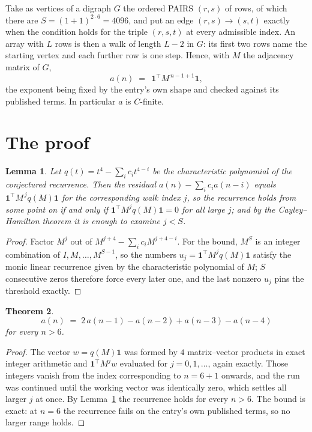 \documentclass[11pt,a4paper]{article}
\theoremstyle{plain}
\newtheorem{theorem}{Theorem}
\newtheorem{lemma}[theorem]{Lemma}
\theoremstyle{definition}
\begin{document}
Take as vertices of a digraph $G$ the ordered PAIRS $(r,s)$ of rows, of which there are
$S=(1+1)^{2\cdot6}=4096$, and put an edge $(r,s)\to(s,t)$ exactly when the condition
holds for the triple $(r,s,t)$ at every admissible index. An array with $L$ rows is then a
walk of length $L-2$ in $G$: its first two rows name the starting vertex and each further
row is one step. Hence, with $M$ the adjacency matrix of $G$,
\[
a(n)\;=\;\,\mathbf{1}^{\!\top}M^{\,n-1+1}\mathbf{1},
\]
the exponent being fixed by the entry's own shape and checked against its published terms.
In particular $a$ is $C$-finite.

\section{The proof}

\begin{lemma}\label{lem:crit}
Let $q(t)=t^{4}-\sum_i c_it^{4-i}$ be the characteristic polynomial of the
conjectured recurrence. Then the residual $a(n)-\sum_ic_ia(n-i)$ equals
$\mathbf{1}^{\!\top}M^{\,j}q(M)\mathbf{1}$ for the corresponding walk index
$j$, so the recurrence holds from some point on if and only if
$\mathbf{1}^{\!\top}M^{j}q(M)\mathbf{1}=0$ for all large $j$; and by the
Cayley--Hamilton theorem it is enough to examine $j<S$.
\end{lemma}

\begin{proof}
Factor $M^{j}$ out of $M^{j+4}-\sum_ic_iM^{j+4-i}$. For the bound, $M^{S}$
is an integer combination of $I,M,\dots,M^{S-1}$, so the numbers
$u_j=\mathbf{1}^{\!\top}M^{j}q(M)\mathbf{1}$ satisfy the monic linear recurrence given by
the characteristic polynomial of $M$; $S$ consecutive zeros therefore force every later one,
and the last nonzero $u_j$ pins the threshold exactly.
\end{proof}

\begin{theorem}
\[
a(n)\;=\;2\,a(n-1) - a(n-2) + a(n-3) - a(n-4)
\]
for every $n>6$.
\end{theorem}

\begin{proof}
The vector $w=q(M)\mathbf{1}$ was formed by $4$ matrix--vector products in exact
integer arithmetic and $\mathbf{1}^{\!\top}M^{j}w$ evaluated for $j=0,1,\dots$, again
exactly. Those integers vanish from the index corresponding to $n=6+1$ onwards, and the
run was continued until the working vector was identically zero, which settles all larger $j$
at once. By Lemma~\ref{lem:crit} the recurrence holds for every $n>6$. The bound is exact: at $n=6$ the recurrence fails on the entry's own published terms, so no larger range holds.
\end{proof}
\end{document}
